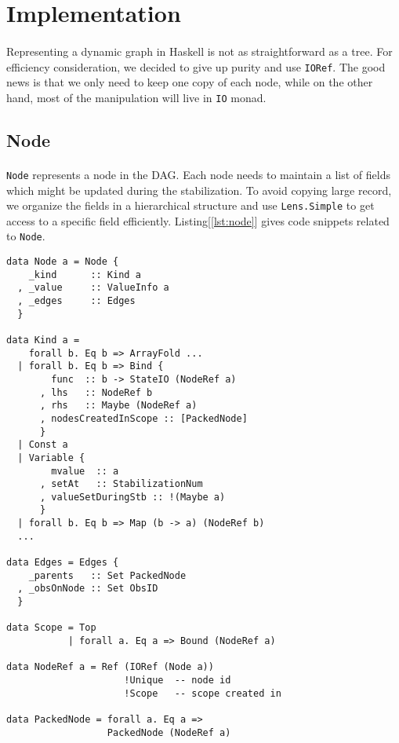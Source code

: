 \documentclass[a4paper, twocolumn]{article}
\newcommand{\code}{\texttt} %
\begin{document}

\section{Implementation}
\paragraph{} Representing a dynamic graph in Haskell is not as straightforward as a tree. For efficiency consideration, we decided to give up purity and use \code{IORef}. The good news is that we only need to keep one copy of each node, while on the other hand, most of the manipulation will live in \code{IO} monad.

\subsection{Node}
\paragraph{} \code{Node} represents a node in the DAG. Each node needs to maintain a list of fields which might be updated during the stabilization. To avoid copying large record, we organize the fields in a hierarchical structure and use \code{Lens.Simple} to get access to a specific field efficiently. Listing[\ref{lst:node}] gives code snippets related to \code{Node}.

\begin{lstlisting}[caption=Node, label={lst:node}]
data Node a = Node {
    _kind      :: Kind a
  , _value     :: ValueInfo a
  , _edges     :: Edges
  }  

data Kind a =
    forall b. Eq b => ArrayFold ...
  | forall b. Eq b => Bind {
        func  :: b -> StateIO (NodeRef a)
      , lhs   :: NodeRef b
      , rhs   :: Maybe (NodeRef a)
      , nodesCreatedInScope :: [PackedNode]
      }
  | Const a
  | Variable {
        mvalue  :: a
      , setAt   :: StabilizationNum
      , valueSetDuringStb :: !(Maybe a)
      }
  | forall b. Eq b => Map (b -> a) (NodeRef b)
  ...
  
data Edges = Edges {
    _parents   :: Set PackedNode
  , _obsOnNode :: Set ObsID
  }

data Scope = Top
           | forall a. Eq a => Bound (NodeRef a)

data NodeRef a = Ref (IORef (Node a))
                     !Unique  -- node id
                     !Scope   -- scope created in

data PackedNode = forall a. Eq a => 
                  PackedNode (NodeRef a)
\end{lstlisting}
\end{document}
